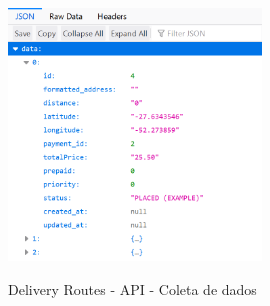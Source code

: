 \begin{figure}[H]
    \centering
    \caption{Delivery Routes - API - Coleta de dados}
    \includegraphics[width=0.6\textwidth]{./dados/figuras/fig14}
    \label{fig:drPlacedAPI}
\end{figure}

 